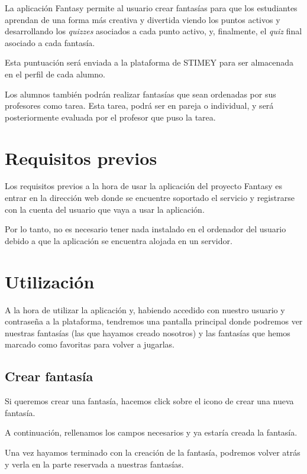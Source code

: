 \documentclass{book}
\begin{document}
La aplicación Fantasy permite al usuario crear fantasías para que los estudiantes aprendan de una forma más creativa y divertida viendo los puntos activos y desarrollando los \textit{quizzes} asociados a cada punto activo, y, finalmente, el \textit{quiz} final asociado a cada fantasía.


Esta puntuación será enviada a la plataforma de STIMEY para ser almacenada en el perfil de cada alumno.


Los alumnos también podrán realizar fantasías que sean ordenadas por sus profesores como tarea. Esta tarea, podrá ser en pareja o individual, y será posteriormente evaluada por el profesor que puso la tarea.


\section{Requisitos previos}

Los requisitos previos a la hora de usar la aplicación del proyecto Fantasy es entrar en la dirección web donde se encuentre soportado el servicio y registrarse con la cuenta del usuario que vaya a usar la aplicación.


Por lo tanto, no es necesario tener nada instalado en el ordenador del usuario debido a que la aplicación se encuentra alojada en un servidor.


\section{Utilización}
A la hora de utilizar la aplicación y, habiendo accedido con nuestro usuario y contraseña a la plataforma, tendremos una pantalla principal donde podremos ver nuestras fantasías (las que hayamos creado nosotros) y las fantasías que hemos marcado como favoritas para volver a jugarlas.

\subsection{Crear fantasía}
Si queremos crear una fantasía, hacemos click sobre el icono de crear una nueva fantasía.



A continuación, rellenamos los campos necesarios y ya estaría creada la fantasía.


Una vez hayamos terminado con la creación de la fantasía, podremos volver atrás y verla en la parte reservada a nuestras fantasías.
\end{document}
